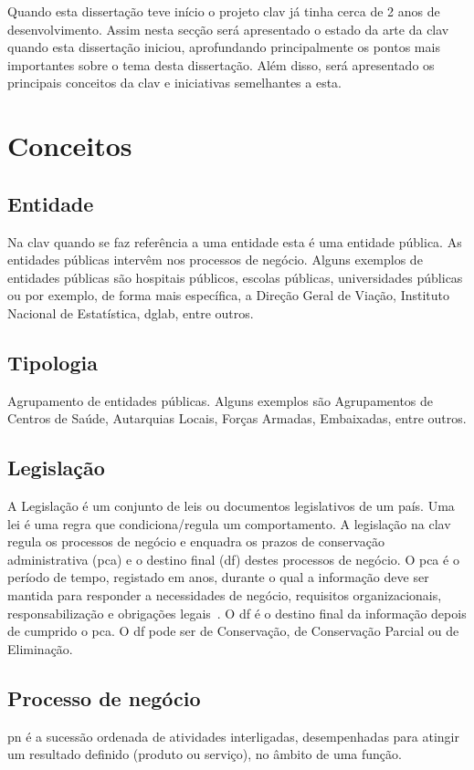 Quando esta dissertação teve início o projeto \acrshort{clav} já tinha cerca de 2 anos de desenvolvimento. Assim nesta secção será apresentado o estado da arte da \acrshort{clav} quando esta dissertação iniciou, aprofundando principalmente os pontos mais importantes sobre o tema desta dissertação. Além disso, será apresentado os principais conceitos da \acrshort{clav} e iniciativas semelhantes a esta.

\section{Conceitos}

\subsection{Entidade}
Na \acrshort{clav} quando se faz referência a uma entidade esta é uma entidade pública. As entidades públicas intervêm nos processos de negócio. Alguns exemplos de entidades públicas são hospitais públicos, escolas públicas, universidades públicas ou por exemplo, de forma mais específica, a Direção Geral de Viação, Instituto Nacional de Estatística, \acrlong{dglab}, entre outros.

\subsection{Tipologia}
Agrupamento de entidades públicas. Alguns exemplos são Agrupamentos de Centros de Saúde, Autarquias Locais, Forças Armadas, Embaixadas, entre outros.

\subsection{Legislação}
A Legislação é um conjunto de leis ou documentos legislativos de um país. Uma lei é uma regra que condiciona/regula um comportamento. A legislação na \acrshort{clav} regula os processos de negócio e enquadra os prazos de conservação administrativa (\acrshort{pca}) e o destino final (\acrshort{df}) destes processos de negócio. O \acrshort{pca} é o período de tempo, registado em anos, durante o qual a informação deve ser mantida para responder a necessidades  de  negócio,  requisitos  organizacionais,  responsabilização  e obrigações legais~\cite{pca}. O \acrshort{df} é o destino final da informação depois de cumprido o \acrshort{pca}. O \acrshort{df} pode ser de Conservação, de Conservação Parcial ou de Eliminação.

\subsection{Processo de negócio}
\acrfull{pn} é a sucessão ordenada de atividades interligadas, desempenhadas para atingir um resultado definido (produto ou serviço), no âmbito de uma função.~\cite{procNeg}

